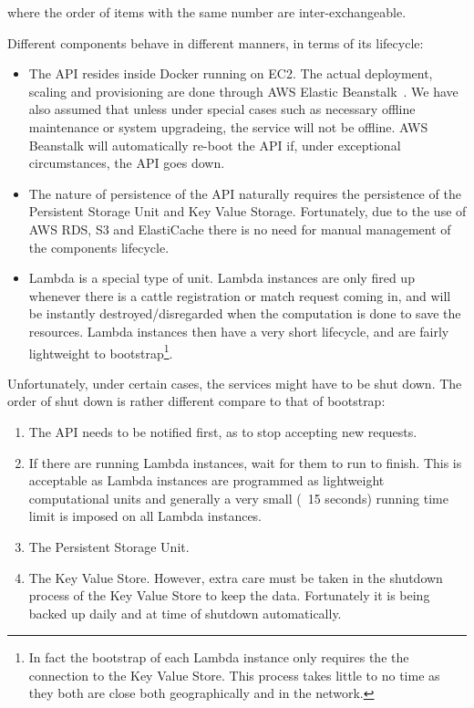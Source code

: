 where the order of items with the same number are inter-exchangeable.

Different components behave in different manners, in terms of its lifecycle:

\begin{itemize}
	\item The API resides inside Docker running on EC2. The actual deployment, scaling and provisioning are done through AWS Elastic Beanstalk~\cite{beanstalk}. We have also assumed that unless under special cases such as necessary offline maintenance or system upgradeing, the service will not be offline. AWS Beanstalk will automatically re-boot the API if, under exceptional circumstances, the API goes down.
	\item The nature of persistence of the API naturally requires the persistence of the Persistent Storage Unit and Key Value Storage. Fortunately, due to the use of AWS RDS, S3 and ElastiCache there is no need for manual management of the components lifecycle.
	\item Lambda is a special type of unit. Lambda instances are only fired up whenever there is a cattle registration or match request coming in, and will be instantly destroyed/disregarded when the computation is done to save the resources. Lambda instances then have a very short lifecycle, and are fairly lightweight to bootstrap\footnote{In fact the bootstrap of each Lambda instance only requires the the connection to the Key Value Store. This process takes little to no time as they both are close both geographically and in the network.}.
\end{itemize}

Unfortunately, under certain cases, the services might have to be shut down. The order of shut down is rather different compare to that of bootstrap:

\begin{enumerate}
	\item The API needs to be notified first, as to stop accepting new requests.
	\item If there are running Lambda instances, wait for them to run to finish. This is acceptable as Lambda instances are programmed as lightweight computational units and generally a very small (~15 seconds) running time limit is imposed on all Lambda instances.
	\item The Persistent Storage Unit.
	\item The Key Value Store. However, extra care must be taken in the shutdown process of the Key Value Store to keep the data. Fortunately it is being backed up daily and at time of shutdown automatically.
\end{enumerate}

